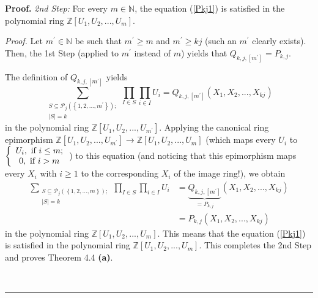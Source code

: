 \documentclass[numbers=enddot,12pt,final,onecolumn,notitlepage]{scrartcl}%
\newenvironment{proof}[1][Proof]{\noindent\textbf{#1.} }{\ \rule{0.5em}{0.5em}}
\begin{document}
\begin{proof}
\textit{2nd Step:} For every $m\in\mathbb{N}$, the equation (\ref{Pkj1}) is
satisfied in the polynomial ring $\mathbb{Z}\left[  U_{1},U_{2},...,U_{m}%
\right]  $.

\textit{Proof.} Let $m^{\prime}\in\mathbb{N}$ be such that $m^{\prime}\geq m$
and $m^{\prime}\geq kj$ (such an $m^{\prime}$ clearly exists). Then, the 1st
Step (applied to $m^{\prime}$ instead of $m$) yields that $Q_{k,j,\left[
m^{\prime}\right]  }=P_{k,j}.$

The definition of $Q_{k,j,\left[  m^{\prime}\right]  }$ yields
\[
\sum_{\substack{S\subseteq\mathcal{P}_{j}\left(  \left\{  1,2,...,m^{\prime
}\right\}  \right)  ;\\\left\vert S\right\vert =k}}\prod_{I\in S}\prod_{i\in
I}U_{i}=Q_{k,j,\left[  m^{\prime}\right]  }\left(  X_{1},X_{2},...,X_{kj}%
\right)
\]
in the polynomial ring $\mathbb{Z}\left[  U_{1},U_{2},...,U_{m^{\prime}%
}\right]  $. Applying the canonical ring epimorphism $\mathbb{Z}\left[
U_{1},U_{2},...,U_{m^{\prime}}\right]  \rightarrow\mathbb{Z}\left[
U_{1},U_{2},...,U_{m}\right]  $ (which maps every $U_{i}$ to $\left\{
\begin{array}
[c]{c}%
U_{i},\text{ if }i\leq m;\\
0,\text{ if }i>m
\end{array}
\right.  $) to this equation (and noticing that this epimorphism maps every
$X_{i}$ with $i\geq1$ to the corresponding $X_{i}$ of the image ring!), we
obtain%
\begin{align*}
\sum_{\substack{S\subseteq\mathcal{P}_{j}\left(  \left\{  1,2,...,m\right\}
\right)  ;\\\left\vert S\right\vert =k}}\prod_{I\in S}\prod_{i\in I}U_{i}  &
=\underbrace{Q_{k,j,\left[  m^{\prime}\right]  }}_{=P_{k,j}}\left(
X_{1},X_{2},...,X_{kj}\right) \\
&  =P_{k,j}\left(  X_{1},X_{2},...,X_{kj}\right)
\end{align*}
in the polynomial ring $\mathbb{Z}\left[  U_{1},U_{2},...,U_{m}\right]  $.
This means that the equation (\ref{Pkj1}) is satisfied in the polynomial ring
$\mathbb{Z}\left[  U_{1},U_{2},...,U_{m}\right]  $. This completes the 2nd
Step and proves Theorem 4.4 \textbf{(a)}.


\end{proof}
\end{document}

